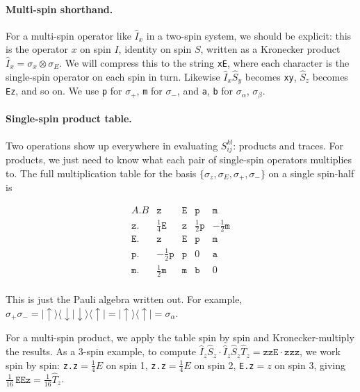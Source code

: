 \documentclass[notitlepage,11pt]{article}
\begin{document}
\paragraph{Multi-spin shorthand.} For a multi-spin operator like $\hat{I}_x$ in a two-spin system, we should be explicit: this is the operator $x$ on spin $I$, identity on spin $S$, written as a Kronecker product $\hat{I}_x=\sigma_x\otimes\sigma_E$. We will compress this to the string \texttt{xE}, where each character is the single-spin operator on each spin in turn. Likewise $\hat{I}_x\hat{S}_y$ becomes \texttt{xy}, $\hat{S}_z$ becomes \texttt{Ez}, and so on. We use \texttt{p} for $\sigma_+$, \texttt{m} for $\sigma_-$, and \texttt{a}, \texttt{b} for $\sigma_\alpha$, $\sigma_\beta$.

\paragraph{Single-spin product table.} Two operations show up everywhere in evaluating $S_{ij}^{kl}$: products and traces. For products, we just need to know what each pair of single-spin operators multiplies to. The full multiplication table for the basis $\{\sigma_z,\sigma_E,\sigma_+,\sigma_-\}$ on a single spin-half is

\begin{equation}
  \begin{array}{c|cccc}
A.B    &  \texttt{z}             & \texttt{E}  & \texttt{p}            & \texttt{m} \\ 
\hline
\texttt{z.}        &  \frac{1}{4}\texttt{E}  & \texttt{z}  & \frac{1}{2}\texttt{p} & -\frac{1}{2}\texttt{m}   \\
\texttt{E.}        &  \texttt{z}             & \texttt{E}  & \texttt{p}         & \texttt{m} \\
\texttt{p.}        &  -\frac{1}{2} \texttt{p} & \texttt{p}  & 0            & \texttt{a} \\
\texttt{m.}        &   \frac{1}{2} \texttt{m} & \texttt{m}  & \texttt{b}            & 0 \\
  \end{array}
  \end{equation}

This is just the Pauli algebra written out. For example, $\sigma_+\sigma_-=|\!\uparrow\rangle\langle\downarrow|\downarrow\rangle\langle\uparrow|=|\!\uparrow\rangle\langle\uparrow|=\sigma_\alpha$.

For a multi-spin product, we apply the table spin by spin and Kronecker-multiply the results. As a 3-spin example, to compute $\hat{I}_z\hat{S}_z\cdot\hat{I}_z\hat{S}_z\hat{T}_z=\texttt{zzE}\cdot\texttt{zzz}$, we work spin by spin: \texttt{z.z}$=\tfrac{1}{4}E$ on spin 1, \texttt{z.z}$=\tfrac{1}{4}E$ on spin 2, \texttt{E.z}$=z$ on spin 3, giving $\tfrac{1}{16}\,\texttt{EEz}=\tfrac{1}{16}\hat{T}_z$.
\end{document}
